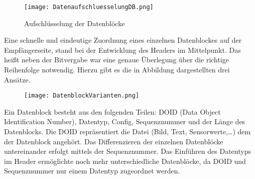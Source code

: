 \begin{figure}[H]
	\centering
	\texttt{[image: DatenaufschluesselungDB.png]}
	\caption{Aufschlüsselung der Datenblöcke}
  \label{fig:DatenaufschluesselungDB}
\end{figure}

Eine schnelle und eindeutige Zuordnung eines einzelnen Datenblockes auf der
Empfängerseite, stand bei der Entwicklung des Headers im Mittelpunkt. Das heißt
neben der Bitvergabe war eine genaue Überlegung über die richtige Reihenfolge
notwendig. Hierzu gibt es die in Abbildung dargestellten drei Ansätze.

\begin{figure}[H]
	\centering
	\texttt{[image: DatenblockVarianten.png]}
\end{figure}

Ein Datenblock besteht aus den folgenden Teilen: DOID (Data Object
Identification Number), Datentyp, Config, Sequenznummer und der Länge des
Datenblocks. Die DOID repräsentiert die Datei (Bild, Text, Sensorwerte,\ldots)
dem der Datenblock angehört. Das Differenzieren der einzelnen Datenblöcke
untereinander erfolgt mittels der Sequenznummer. Das Einführen des Datentyps im
Header ermöglichte noch mehr unterschiedliche Datenblöcke, da DOID und
Sequenznummer nur einem Datentyp zugeordnet werden.

